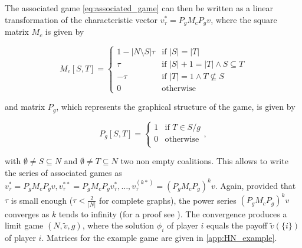 The associated game \cref{eq:associated_game} can 
then be written as a linear transformation of the characteristic vector $v^*_\tau = P_g M_c P_g v$, 
where the square matrix $M_c$ is given by\cite{hamiache_associated_2020,hamiache2010matrix}


\begin{equation}
	M_c[S, T] =
	\begin{cases}
		1 - |N \setminus S| \tau & \text{if } |S| = |T|                         \\
		\tau                     & \text{if } |S| + 1 = |T| \land S \subseteq T \\
		-\tau                    & \text{if } |T| = 1  \land T \not \subseteq S \\
		0                        & \text{otherwise}
	\end{cases}
\end{equation}


and matrix $P_g$, which represents the graphical structure of the game, is given by


\begin{equation}
	P_g[S, T] =
	\begin{cases}
		1 & \text{if } T \in S/g \\
		0 & \text{otherwise}     \\
	\end{cases}
	,
\end{equation}


with $\emptyset \ne S \subseteq N$ and $\emptyset \ne T \subseteq N$ two non empty coalitions. 
This allows to write the series of associated games as 
$v^*_\tau = P_g M_c P_g v, v^{**}_\tau = P_g M_c P_g v^*_\tau, \dots, v^{(k*)}_\tau = \left(P_g M_c P_g\right)^k v$.
Again, provided that $\tau$ is small enough ($\tau < \frac{2}{|N|}$ for complete graphs\cite{hamiache2001associated}),
the power series $\left(P_g M_c P_g\right)^k v$ converges as $k$ tends to infinity (for a proof see
).
The convergence produces a limit game $(N, \tilde{v}, g)$, where the solution $\phi_i$ of player $i$ equals the
payoff $\tilde{v}(\{i\})$ of player $i$.\cite{zhang2022gstarx, hamiache_associated_2020}
Matrices for the example game are given in \cref{app:HN_example}.


% 


